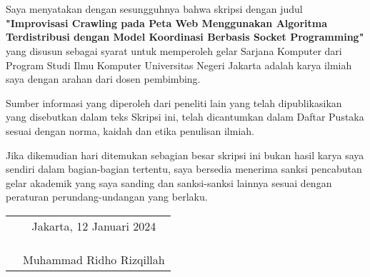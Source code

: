 \chapter*{}
\onehalfspacing{}

Saya menyatakan dengan sesungguhnya bahwa skripsi dengan judul
\textbf{"Improvisasi Crawling pada Peta Web Menggunakan Algoritma Terdistribusi dengan Model Koordinasi Berbasis Socket Programming"} yang disusun sebagai syarat untuk memperoleh gelar Sarjana Komputer
dari Program Studi Ilmu Komputer Universitas Negeri Jakarta adalah karya ilmiah
saya dengan arahan dari dosen pembimbing.

Sumber informasi yang diperoleh dari peneliti lain yang telah dipublikasikan 
yang disebutkan dalam teks Skripsi ini, telah dicantumkan dalam Daftar Pustaka 
sesuai dengan norma, kaidah dan etika penulisan ilmiah.

Jika dikemudian hari ditemukan sebagian besar skripsi ini bukan hasil karya saya 
sendiri dalam bagian-bagian tertentu, saya bersedia menerima sanksi pencabutan 
gelar akademik yang saya sanding dan sanksi-sanksi lainnya sesuai dengan 
peraturan perundang-undangan yang berlaku.

\vspace{4cm}

\begin{tabular}{p{7.5cm}c}
	&Jakarta, 12 Januari 2024\\
	&\\
	&\\
	&\\
	&Muhammad Ridho Rizqillah
\end{tabular}
